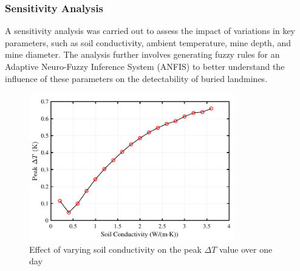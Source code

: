     
    \subsubsection{Sensitivity Analysis}
    
        A sensitivity analysis was carried out to assess the impact of variations in key parameters, such as soil conductivity, ambient temperature, mine depth, and mine diameter. The analysis further involves generating fuzzy rules for an Adaptive Neuro-Fuzzy Inference System (ANFIS) to better understand the influence of these parameters on the detectability of buried landmines.
        
        \begin{figure}[htbp]
            \centering
            \includegraphics[width=0.8\textwidth]{figs/Rory/thermal_sensitivity_conductivity.pdf}
            \caption{Effect of varying soil conductivity on the peak $\Delta T$ value over one day}
            \label{fig:thermal_sensitivity_conductivity}
        \end{figure}
    
    